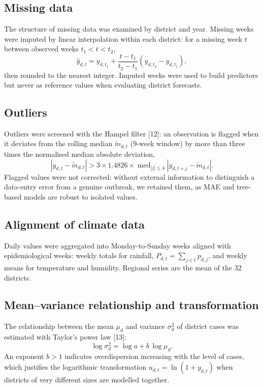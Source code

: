 \documentclass[11pt]{article}
\begin{document}
\subsection{Missing data}
The structure of missing data was examined by district and year. Missing weeks were imputed by linear interpolation within each district: for a missing week $t$ between observed weeks $t_1<t<t_2$,
\begin{equation}
\hat{y}_{d,t}=y_{d,t_1}+\frac{t-t_1}{t_2-t_1}\left(y_{d,t_2}-y_{d,t_1}\right),
\label{eq:interp}
\end{equation}
then rounded to the nearest integer. Imputed weeks were used to build predictors but never as reference values when evaluating district forecasts.

\subsection{Outliers}
Outliers were screened with the Hampel filter [12]: an observation is flagged when it deviates from the rolling median $\tilde{m}_{d,t}$ (9-week window) by more than three times the normalised median absolute deviation,
\begin{equation}
\left|y_{d,t}-\tilde{m}_{d,t}\right|>3\times1.4826\times\operatorname{med}_{|j|\le4}\left|y_{d,t+j}-\tilde{m}_{d,t}\right|.
\label{eq:hampel}
\end{equation}
Flagged values were not corrected: without external information to distinguish a data-entry error from a genuine outbreak, we retained them, as MAE and tree-based models are robust to isolated values.

\subsection{Alignment of climate data}
Daily values were aggregated into Monday-to-Sunday weeks aligned with epidemiological weeks: weekly totals for rainfall, $P_{d,t}=\sum_{j\in t}p_{d,j}$, and weekly means for temperature and humidity. Regional series are the mean of the 32 districts.

\subsection{Mean–variance relationship and transformation}
The relationship between the mean $\mu_d$ and variance $\sigma^2_d$ of district cases was estimated with Taylor's power law [13]:
\begin{equation}
\log\sigma^2_d=\log a+b\,\log\mu_d .
\label{eq:taylor}
\end{equation}
An exponent $b>1$ indicates overdispersion increasing with the level of cases, which justifies the logarithmic transformation $u_{d,t}=\ln(1+y_{d,t})$ when districts of very different sizes are modelled together.
\end{document}
